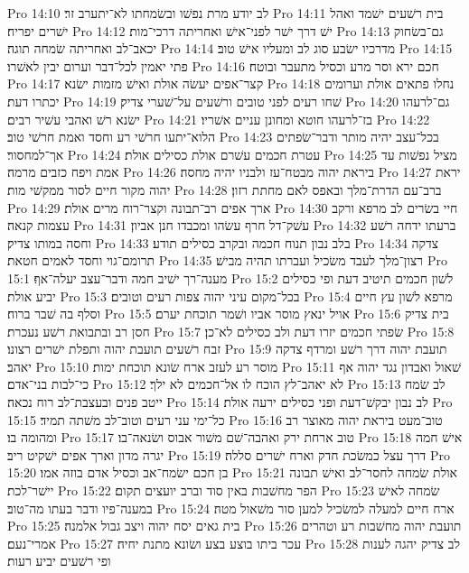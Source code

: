 Pro 14:10  לב יודע מרת נפשׁו ובשׂמחתו לא־יתערב זר׃
Pro 14:11  בית רשׁעים ישׁמד ואהל ישׁרים יפריח׃
Pro 14:12  ישׁ דרך ישׁר לפני־אישׁ ואחריתה דרכי־מות׃
Pro 14:13  גם־בשׂחוק יכאב־לב ואחריתה שׂמחה תוגה׃
Pro 14:14  מדרכיו ישׂבע סוג לב ומעליו אישׁ טוב׃
Pro 14:15  פתי יאמין לכל־דבר וערום יבין לאשׁרו׃
Pro 14:16  חכם ירא וסר מרע וכסיל מתעבר ובוטח׃
Pro 14:17  קצר־אפים יעשׂה אולת ואישׁ מזמות ישׂנא׃
Pro 14:18  נחלו פתאים אולת וערומים יכתרו דעת׃
Pro 14:19  שׁחו רעים לפני טובים ורשׁעים על־שׁערי צדיק׃
Pro 14:20  גם־לרעהו ישׂנא רשׁ ואהבי עשׁיר רבים׃
Pro 14:21  בז־לרעהו חוטא ומחונן עניים אשׁריו׃
Pro 14:22  הלוא־יתעו חרשׁי רע וחסד ואמת חרשׁי טוב׃
Pro 14:23  בכל־עצב יהיה מותר ודבר־שׂפתים אך־למחסור׃
Pro 14:24  עטרת חכמים עשׁרם אולת כסילים אולת׃
Pro 14:25  מציל נפשׁות עד אמת ויפח כזבים מרמה׃
Pro 14:26  ביראת יהוה מבטח־עז ולבניו יהיה מחסה׃
Pro 14:27  יראת יהוה מקור חיים לסור ממקשׁי מות׃
Pro 14:28  ברב־עם הדרת־מלך ובאפס לאם מחתת רזון׃
Pro 14:29  ארך אפים רב־תבונה וקצר־רוח מרים אולת׃
Pro 14:30  חיי בשׂרים לב מרפא ורקב עצמות קנאה׃
Pro 14:31  עשׁק־דל חרף עשׂהו ומכבדו חנן אביון׃
Pro 14:32  ברעתו ידחה רשׁע וחסה במותו צדיק׃
Pro 14:33  בלב נבון תנוח חכמה ובקרב כסילים תודע׃
Pro 14:34  צדקה תרומם־גוי וחסד לאמים חטאת׃
Pro 14:35  רצון־מלך לעבד משׂכיל ועברתו תהיה מבישׁ׃
Pro 15:1  מענה־רך ישׁיב חמה ודבר־עצב יעלה־אף׃
Pro 15:2  לשׁון חכמים תיטיב דעת ופי כסילים יביע אולת׃
Pro 15:3  בכל־מקום עיני יהוה צפות רעים וטובים׃
Pro 15:4  מרפא לשׁון עץ חיים וסלף בה שׁבר ברוח׃
Pro 15:5  אויל ינאץ מוסר אביו ושׁמר תוכחת יערם׃
Pro 15:6  בית צדיק חסן רב ובתבואת רשׁע נעכרת׃
Pro 15:7  שׂפתי חכמים יזרו דעת ולב כסילים לא־כן׃
Pro 15:8  זבח רשׁעים תועבת יהוה ותפלת ישׁרים רצונו׃
Pro 15:9  תועבת יהוה דרך רשׁע ומרדף צדקה יאהב׃
Pro 15:10  מוסר רע לעזב ארח שׂונא תוכחת ימות׃
Pro 15:11  שׁאול ואבדון נגד יהוה אף כי־לבות בני־אדם׃
Pro 15:12  לא יאהב־לץ הוכח לו אל־חכמים לא ילך׃
Pro 15:13  לב שׂמח ייטב פנים ובעצבת־לב רוח נכאה׃
Pro 15:14  לב נבון יבקשׁ־דעת ופני כסילים ירעה אולת׃
Pro 15:15  כל־ימי עני רעים וטוב־לב משׁתה תמיד׃
Pro 15:16  טוב־מעט ביראת יהוה מאוצר רב ומהומה בו׃
Pro 15:17  טוב ארחת ירק ואהבה־שׁם משׁור אבוס ושׂנאה־בו׃
Pro 15:18  אישׁ חמה יגרה מדון וארך אפים ישׁקיט ריב׃
Pro 15:19  דרך עצל כמשׂכת חדק וארח ישׁרים סללה׃
Pro 15:20  בן חכם ישׂמח־אב וכסיל אדם בוזה אמו׃
Pro 15:21  אולת שׂמחה לחסר־לב ואישׁ תבונה יישׁר־לכת׃
Pro 15:22  הפר מחשׁבות באין סוד וברב יועצים תקום׃
Pro 15:23  שׂמחה לאישׁ במענה־פיו ודבר בעתו מה־טוב׃
Pro 15:24  ארח חיים למעלה למשׂכיל למען סור משׁאול מטה׃
Pro 15:25  בית גאים יסח יהוה ויצב גבול אלמנה׃
Pro 15:26  תועבת יהוה מחשׁבות רע וטהרים אמרי־נעם׃
Pro 15:27  עכר ביתו בוצע בצע ושׂונא מתנת יחיה׃
Pro 15:28  לב צדיק יהגה לענות ופי רשׁעים יביע רעות׃
